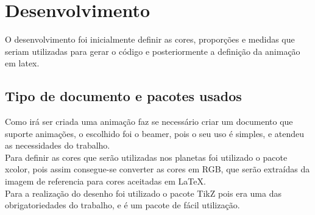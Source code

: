 \documentclass[
	12pt,				%
	openright,			%
	oneside,
	a4paper,			%
	english,			%
	french,				%
	spanish,			%
	brazil,				%
	]{abntex2}
\begin{document}
\chapter[Desenvolvimento]{Desenvolvimento}

O desenvolvimento foi inicialmente definir as cores, proporções e medidas que seriam utilizadas para gerar o código e posteriormente a definição da animação em latex. 

\section{Tipo de documento e pacotes usados}
	Como irá ser criada uma animação faz se necessário criar um documento que suporte animações, o escolhido foi o beamer, pois o seu uso é simples, e atendeu as necessidades do trabalho.
	\\ \indent Para definir as cores que serão utilizadas nos planetas foi utilizado o pacote xcolor, pois assim consegue-se converter as cores em RGB, que serão extraídas da imagem de referencia para cores aceitadas em LaTeX.
	\\ \indent Para a realização do desenho foi utilizado o pacote TikZ pois era uma das obrigatoriedades do trabalho, e é um pacote de fácil utilização.
\end{document}
